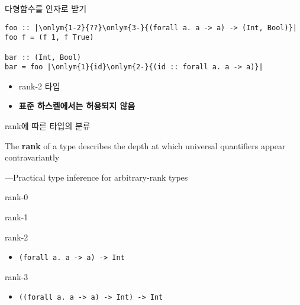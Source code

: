 \documentclass{beamer}
\newcommand\onlym[2]{\only<#1>{#2}}
\begin{document}
\begin{frame}[fragile] {다형함수를 인자로 받기}
\begin{verbatim}
foo :: |\onlym{1-2}{??}\onlym{3-}{(forall a. a -> a) -> (Int, Bool)}|
foo f = (f 1, f True)

bar :: (Int, Bool)
bar = foo |\onlym{1}{id}\onlym{2-}{(id :: forall a. a -> a)}|
\end{verbatim}
   {
    \begin{itemize}
      \item rank-2 타입
      \item \textbf{표준 하스켈에서는 허용되지 않음}
    \end{itemize}
  }
\end{frame}

\begin{frame} {rank에 따른 타입의 분류}
  \begin{displayquote}
  The \textbf{rank} of a type describes the depth at which universal quantifiers appear contravariantly
  \par\raggedleft---Practical type inference for arbitrary-rank types
  \end{displayquote}
  
  \pause
  \begin{block}{rank-0}
  \end{block}

  \pause
  \begin{block}{rank-1}
  \end{block}

  \pause
  \begin{block}{rank-2}
  \begin{itemize}\item\texttt{(forall a. a -> a) -> Int}\end{itemize}
  \end{block}

  \pause
  \begin{block}{rank-3}
    \begin{itemize}
      \item \texttt{((forall a. a -> a) -> Int) -> Int}
    \end{itemize}
  \end{block}
\end{frame}
\end{document}
